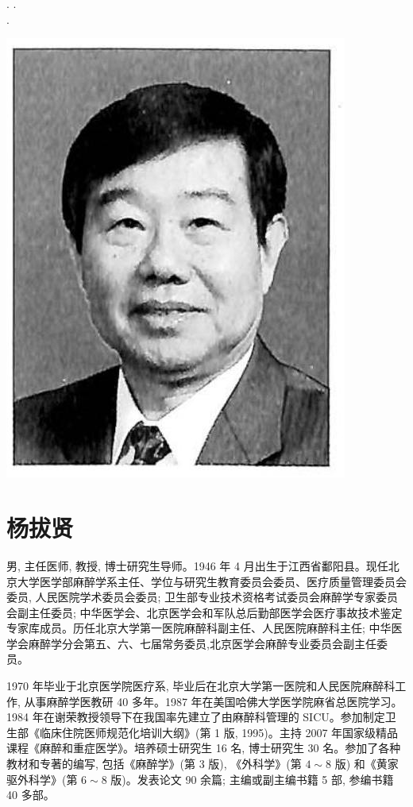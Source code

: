 \documentclass[10pt]{article}
\begin{document}
. .\\
.

\begin{center}
\includegraphics[max width=\textwidth]{2024_07_09_002a177993bd97d1d6d7g-012(1)}
\end{center}

\section*{杨拔贤}
男, 主任医师, 教授, 博士研究生导师。1946 年 4 月出生于江西省鄱阳县。现任北京大学医学部麻醉学系主任、学位与研究生教育委员会委员、医疗质量管理委员会委员, 人民医院学术委员会委员; 卫生部专业技术资格考试委员会麻醉学专家委员会副主任委员; 中华医学会、北京医学会和军队总后勤部医学会医疗事故技术鉴定专家库成员。历任北京大学第一医院麻醉科副主任、人民医院麻醉科主任; 中华医学会麻醉学分会第五、六、七届常务委员,北京医学会麻醉专业委员会副主任委员。

1970 年毕业于北京医学院医疗系, 毕业后在北京大学第一医院和人民医院麻醉科工作, 从事麻醉学医教研 40 多年。1987 年在美国哈佛大学医学院麻省总医院学习。1984 年在谢荣教授领导下在我国率先建立了由麻醉科管理的 SICU。参加制定卫生部《临床住院医师规范化培训大纲》(第 1 版, 1995)。主持 2007 年国家级精品课程《麻醉和重症医学》。培养硕士研究生 16 名, 博士研究生 30 名。参加了各种教材和专著的编写, 包括《麻醉学》(第 3 版), 《外科学》(第 $4 \sim 8$ 版) 和《黄家驱外科学》(第 $6 \sim 8$ 版)。发表论文 90 余篇; 主编或副主编书籍 5 部, 参编书籍 40 多部。
\end{document}
